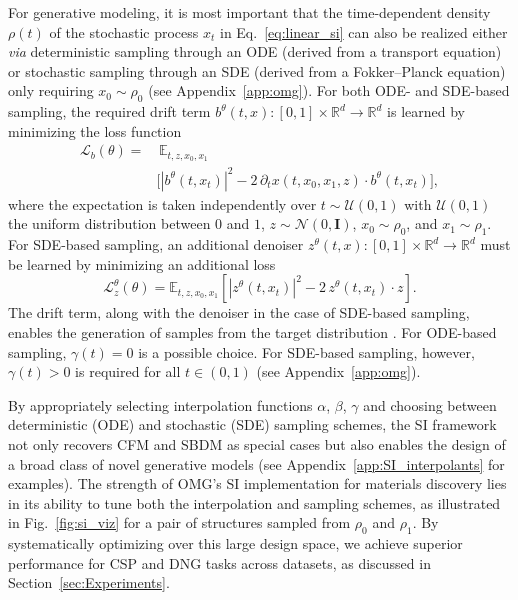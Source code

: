 For generative modeling, it is most important that the time-dependent density $\rho(t)$ of the stochastic process $x_t$ in Eq.~\ref{eq:linear_si} can also be realized either \emph{via} deterministic sampling through an ODE (derived from a transport equation) or stochastic sampling through an SDE (derived from a Fokker--Planck equation) only requiring $x_0\sim\rho_0$ (see Appendix~\ref{app:omg}).
For both ODE- and SDE-based sampling, the required drift term $b^\theta(t, x): [0,1] \times \mathbb{R}^d \rightarrow \mathbb{R}^d$ is learned by minimizing the loss function
\begin{equation}
    \begin{split}
        \mathcal{L}_b(\theta) = 
         &\, \mathbb{E}_{t, z, x_0, x_1} \\
         &\big[ |b^\theta(t, x_t)|^2 - 2\,\partial_t x(t, x_0, x_1, z) \cdot b^\theta(t, x_t) \big],
    \end{split}
\label{eq:loss_b}
\end{equation}
where the expectation is taken independently over $t\sim \mathcal{U}(0,1)$ with $\mathcal{U}(0,1)$ the uniform distribution between $0$ and $1$, $z\sim\mathcal{N}(0, \bm{I})$, $x_0\sim\rho_0$, and $x_1\sim\rho_1$.
For SDE-based sampling, an additional denoiser $z^\theta(t,x): [0,1] \times \mathbb{R}^d \rightarrow \mathbb{R}^d$  must be learned by minimizing an additional loss
\begin{equation}
    \mathcal{L}_z^\theta(\theta) = \mathbb{E}_{t, z, x_0, x_1} \left[ |z^\theta(t, x_t)|^2 - 2\,z^\theta(t, x_t) \cdot z \right].
\label{eq:loss_z}
\end{equation}
The drift term, along with the denoiser in the case of SDE-based sampling, enables the generation of samples from the target distribution \citep{albergo_stochastic_2023}.
For ODE-based sampling, $\gamma(t)=0$ is a possible choice. For SDE-based sampling, however, $\gamma(t)>0$ is required for all $t\in(0,1)$ (see Appendix~\ref{app:omg}).

By appropriately selecting interpolation functions $\alpha$, $\beta$, $\gamma$ and choosing between deterministic (ODE) and stochastic (SDE) sampling schemes, the SI framework not only recovers CFM and SBDM as special cases but also enables the design of a broad class of novel generative models (see Appendix~\ref{app:SI_interpolants} for examples).
The strength of OMG's SI implementation for materials discovery lies in its ability to tune both the interpolation and sampling schemes, as illustrated in Fig.~\ref{fig:si_viz} for a pair of structures sampled from $\rho_0$ and $\rho_1$.
By systematically optimizing over this large design space, we achieve superior performance for CSP and DNG tasks across datasets, as discussed in Section~\ref{sec:Experiments}. 

